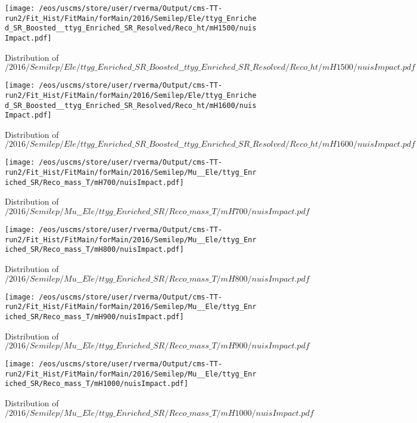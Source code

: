 \begin{figure}
\centering
\texttt{[image: /eos/uscms/store/user/rverma/Output/cms-TT-run2/Fit\_Hist/FitMain/forMain/2016/Semilep/Ele/ttyg\_Enriched\_SR\_Boosted\_\_ttyg\_Enriched\_SR\_Resolved/Reco\_ht/mH1500/nuisImpact.pdf]}
\caption{Distribution of $/2016/Semilep/Ele/ttyg\_Enriched\_SR\_Boosted\_\_ttyg\_Enriched\_SR\_Resolved/Reco\_ht/mH1500/nuisImpact.pdf$}
\end{figure}

\begin{figure}
\centering
\texttt{[image: /eos/uscms/store/user/rverma/Output/cms-TT-run2/Fit\_Hist/FitMain/forMain/2016/Semilep/Ele/ttyg\_Enriched\_SR\_Boosted\_\_ttyg\_Enriched\_SR\_Resolved/Reco\_ht/mH1600/nuisImpact.pdf]}
\caption{Distribution of $/2016/Semilep/Ele/ttyg\_Enriched\_SR\_Boosted\_\_ttyg\_Enriched\_SR\_Resolved/Reco\_ht/mH1600/nuisImpact.pdf$}
\end{figure}

\begin{figure}
\centering
\texttt{[image: /eos/uscms/store/user/rverma/Output/cms-TT-run2/Fit\_Hist/FitMain/forMain/2016/Semilep/Mu\_\_Ele/ttyg\_Enriched\_SR/Reco\_mass\_T/mH700/nuisImpact.pdf]}
\caption{Distribution of $/2016/Semilep/Mu\_\_Ele/ttyg\_Enriched\_SR/Reco\_mass\_T/mH700/nuisImpact.pdf$}
\end{figure}

\begin{figure}
\centering
\texttt{[image: /eos/uscms/store/user/rverma/Output/cms-TT-run2/Fit\_Hist/FitMain/forMain/2016/Semilep/Mu\_\_Ele/ttyg\_Enriched\_SR/Reco\_mass\_T/mH800/nuisImpact.pdf]}
\caption{Distribution of $/2016/Semilep/Mu\_\_Ele/ttyg\_Enriched\_SR/Reco\_mass\_T/mH800/nuisImpact.pdf$}
\end{figure}

\begin{figure}
\centering
\texttt{[image: /eos/uscms/store/user/rverma/Output/cms-TT-run2/Fit\_Hist/FitMain/forMain/2016/Semilep/Mu\_\_Ele/ttyg\_Enriched\_SR/Reco\_mass\_T/mH900/nuisImpact.pdf]}
\caption{Distribution of $/2016/Semilep/Mu\_\_Ele/ttyg\_Enriched\_SR/Reco\_mass\_T/mH900/nuisImpact.pdf$}
\end{figure}

\begin{figure}
\centering
\texttt{[image: /eos/uscms/store/user/rverma/Output/cms-TT-run2/Fit\_Hist/FitMain/forMain/2016/Semilep/Mu\_\_Ele/ttyg\_Enriched\_SR/Reco\_mass\_T/mH1000/nuisImpact.pdf]}
\caption{Distribution of $/2016/Semilep/Mu\_\_Ele/ttyg\_Enriched\_SR/Reco\_mass\_T/mH1000/nuisImpact.pdf$}
\end{figure}

